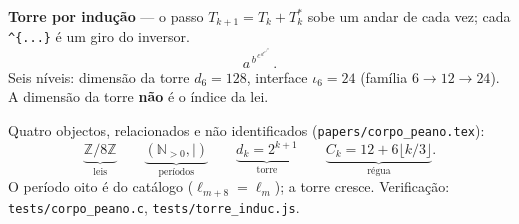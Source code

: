 \documentclass[11pt,a4paper]{article}
\newcommand{\code}[1]{\texttt{#1}}
\begin{document}
\noindent\textbf{Torre por indução} --- o passo $T_{k+1}=T_k+T_k^{*}$ sobe um andar de cada vez;
cada \texttt{\^{}\{...\}} é um giro do inversor.
\[
  a^{\,b^{\,c^{\,d^{\,e^{\,f^{\,g}}}}}}\,.
\]
Seis níveis: dimensão da torre $d_6=128$, interface $\iota_6=24$
(família $6\to12\to24$). A dimensão da torre \textbf{não} é o índice da lei.

\medskip\noindent Quatro objectos, relacionados e não identificados
(\code{papers/corpo\_peano.tex}):
\[
\underbrace{\mathbb{Z}/8\mathbb{Z}}_{\text{leis}}
\qquad
\underbrace{(\mathbb{N}_{>0},\mid)}_{\text{períodos}}
\qquad
\underbrace{d_k=2^{k+1}}_{\text{torre}}
\qquad
\underbrace{C_k=12+6\lfloor k/3\rfloor}_{\text{régua}}.
\]
O período oito é do catálogo ($\ell_{m+8}=\ell_m$); a torre cresce.
Verificação: \code{tests/corpo\_peano.c}, \code{tests/torre\_induc.js}.
\end{document}
